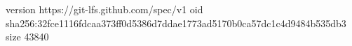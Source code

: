 version https://git-lfs.github.com/spec/v1
oid sha256:32fce1116fdcaa373ff0d5386d7ddae1773ad5170b0ca57dc1c4d9484b535db3
size 43840
